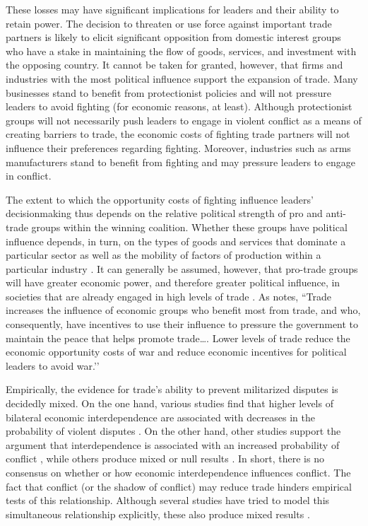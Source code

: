 These losses may have significant implications for leaders and their ability to retain power. The decision to threaten or use force against important trade partners is likely to elicit significant opposition from domestic interest groups who have a stake in maintaining the flow of goods, services, and investment with the opposing country. It cannot be taken for granted, however, that firms and industries with the most political influence support the expansion of trade. Many businesses stand to benefit from protectionist policies and will not pressure leaders to avoid fighting (for economic reasons, at least). Although protectionist groups will not necessarily push leaders to engage in violent conflict as a means of creating barriers to trade, the economic costs of fighting trade partners will not influence their preferences regarding fighting. Moreover, industries such as arms manufacturers stand to benefit from fighting and may pressure leaders to engage in conflict. 

The extent to which the opportunity costs of fighting influence leaders’ decisionmaking thus depends on the relative political strength of pro and anti-trade groups within the winning coalition. Whether these groups have political influence depends, in turn, on the types of goods and services that dominate a particular sector as well as the mobility of factors of production within a particular industry \citep{hiscox2002}. It can generally be assumed, however, that pro-trade groups will have greater economic power, and therefore greater political influence, in societies that are already engaged in high levels of trade \citep{rogowski1989, solingen1989}. As \citet[][128]{levy2009} notes, ``Trade increases the influence of economic groups who benefit most from trade, and who, consequently, have incentives to use their influence to pressure the government to maintain the peace that helps promote trade…. Lower levels of trade reduce the economic opportunity costs of war and reduce economic incentives for political leaders to avoid war.’’

Empirically, the evidence for trade’s ability to prevent militarized disputes is decidedly mixed. On the one hand, various studies find that higher levels of bilateral economic interdependence are associated with decreases in the probability of violent disputes \citep[e.g.,][]{choi2011, gartzke2003, gartzke2007, russett2001, oneal2002}. On the other hand, other studies support the argument that interdependence is associated with an increased probability of conflict \citep[e.g.,][]{barbieri2002, crescenzi2003a}, while others produce mixed or null results \citep[e.g.,][]{choi2011, gartzke2001, gartzke2003, gartzke2007, green2001}. In short, there is no consensus on whether or how economic interdependence influences conflict. The fact that conflict (or the shadow of conflict) may reduce trade hinders empirical tests of this relationship. Although several studies have tried to model this simultaneous relationship explicitly, these also produce mixed results \citep{hegre2010, keshk2004, kim1998b, kim2005, mansfield1994, pollins1989a, pollins1989b, reuveny1996}.

